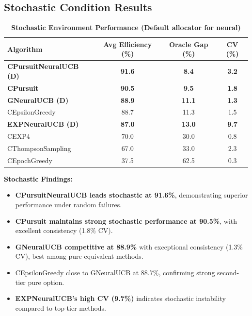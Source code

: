 \documentclass[12pt,a4paper]{article}
\newcommand{\stochastic}[1]{\textcolor{stochasticcolor}{\textbf{#1}}}
\newcommand{\legacy}[1]{\textcolor{legacycolor}{\textbf{#1}}}
\newcommand{\neural}[1]{\textcolor{neuralcolor}{\textbf{#1}}}
\begin{document}
\begin{tcolorbox}[colback=stochasticcolor!10,colframe=stochasticcolor,title=\textbf{Stochastic Environment Performance}]

\subsection{Stochastic Condition Results}

\begin{table}[H]
\small
\centering
\caption{\stochastic{Stochastic Environment Performance (Default allocator for neural)}}
\begin{tabular}{|l|c|c|c|}
\hline
\textbf{Algorithm} & \textbf{Avg Efficiency (\%)} & \textbf{Oracle Gap (\%)} & \textbf{CV (\%)} \\
\hline
\hline
\neural{CPursuitNeuralUCB (D)}   & \neural{\textbf{91.6}} & \neural{8.4}      & \neural{3.2} \\
\stochastic{CPursuit}            & \stochastic{\textbf{90.5}} & \stochastic{9.5}  & \stochastic{1.8} \\
\neural{GNeuralUCB (D)}          & \neural{\textbf{88.9}} & \neural{11.1}     & \neural{1.3} \\
CEpsilonGreedy                   & 88.7                   & 11.3              & 1.5 \\
\legacy{EXPNeuralUCB (D)}        & \legacy{87.0}          & \legacy{13.0}     & \legacy{9.7} \\
CEXP4                           & 70.0                   & 30.0              & 0.8 \\
CThompsonSampling               & 67.0                   & 33.0              & 2.3 \\
CEpochGreedy                    & 37.5                   & 62.5              & 0.3 \\
\hline
\end{tabular}
\end{table}

\textbf{Stochastic Findings:}
\begin{itemize}
\item \neural{CPursuitNeuralUCB leads stochastic at 91.6\%}, demonstrating superior performance under random failures.
\item \stochastic{CPursuit maintains strong stochastic performance at 90.5\%}, with excellent consistency (1.8\% CV).
\item \neural{GNeuralUCB competitive at 88.9\%} with exceptional consistency (1.3\% CV), best among pure-equivalent methods.
\item CEpsilonGreedy close to GNeuralUCB at 88.7\%, confirming strong second-tier pure option.
\item \legacy{EXPNeuralUCB's high CV (9.7\%)} indicates stochastic instability compared to top-tier methods.
\end{itemize}

\end{tcolorbox}
\end{document}
